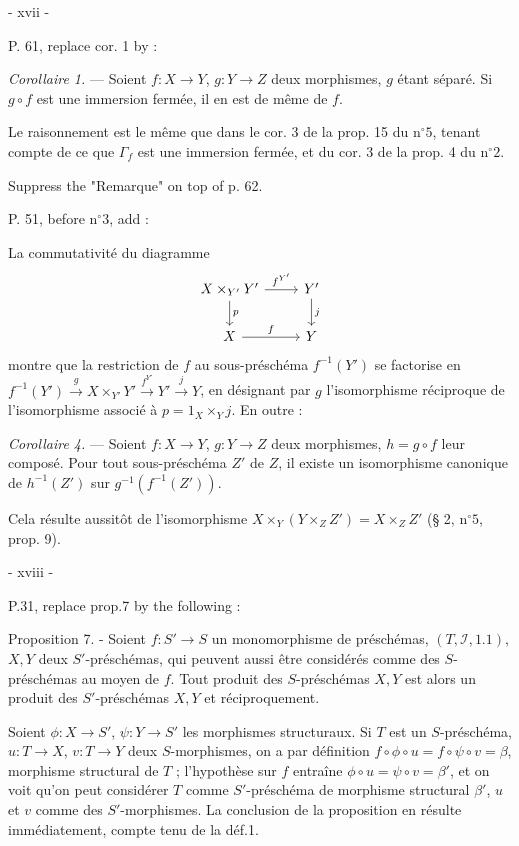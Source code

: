 \newpage


- xvii -

P. 61, replace cor. 1 by :

\emph{Corollaire 1.} — Soient $f : X \to Y$, $g : Y \to Z$ deux morphismes, $g$ étant séparé. Si $g \circ f$ est une immersion fermée, il en est de même de $f$.

Le raisonnement est le même que dans le cor. 3 de la prop. 15 du n$^\circ 5$, tenant compte de ce que $\Gamma_f$ est une immersion fermée, et du cor. 3 de la prop. 4 du n$^\circ 2$.

Suppress the "Remarque" on top of p. 62.

P. 51, before n$^\circ 3$, add :

La commutativité du diagramme
$$\begin{tikzcd}
X \times_{Y'} Y' \arrow[r, "f^{Y'}"] \arrow[d, "p"] & Y' \arrow[d, "j"] \\
X \arrow[r, "f"] & Y
\end{tikzcd}$$
montre que la restriction de $f$ au sous-préschéma $f^{-1}(Y')$ se factorise en $f^{-1}(Y') \xrightarrow{g} X \times_{Y'} Y' \xrightarrow{f^{Y'}} Y' \xrightarrow{j} Y$, en désignant par $g$ l'isomorphisme réciproque de l'isomorphisme associé à $p = 1_X \times_Y j$. En outre :

\emph{Corollaire 4.} — Soient $f : X \to Y$, $g : Y \to Z$ deux morphismes, $h = g \circ f$ leur composé. Pour tout sous-préschéma $Z'$ de $Z$, il existe un isomorphisme canonique de $h^{-1}(Z')$ sur $g^{-1}(f^{-1}(Z'))$.

Cela résulte aussitôt de l'isomorphisme $X \times_Y (Y \times_Z Z') = X \times_Z Z'$ (§ 2, n$^\circ 5$, prop. 9).

\newpage


- xviii -

P.31, replace prop.7 by the following :

Proposition 7. - Soient $f : S' \to S$ un monomorphisme de préschémas, $(T, \mathcal{I}, 1.1)$, $X, Y$ deux $S'$-préschémas, qui peuvent aussi être considérés comme des $S$-préschémas au moyen de $f$. Tout produit des $S$-préschémas $X, Y$ est alors un produit des $S'$-préschémas $X, Y$ et réciproquement.

Soient $\phi : X \to S'$, $\psi : Y \to S'$ les morphismes structuraux. Si $T$ est un $S$-préschéma, $u : T \to X$, $v : T \to Y$ deux $S$-morphismes, on a par définition $f \circ \phi \circ u = f \circ \psi \circ v = \beta$, morphisme structural de $T$ ; l'hypothèse sur $f$ entraîne $\phi \circ u = \psi \circ v = \beta'$, et on voit qu'on peut considérer $T$ comme $S'$-préschéma de morphisme structural $\beta'$, $u$ et $v$ comme des $S'$-morphismes. La conclusion de la proposition en résulte immédiatement, compte tenu de la déf.1.

